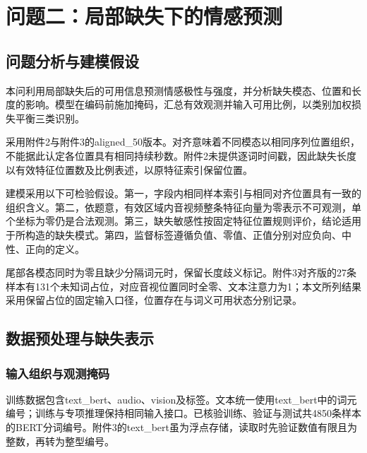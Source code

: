 \section{问题二：局部缺失下的情感预测}
\hypertarget{q2-ux95eeux9898ux5206ux6790ux4e0eux5efaux6a21ux5047ux8bbe}{%
\subsection{问题分析与建模假设}\label{q2-ux95eeux9898ux5206ux6790ux4e0eux5efaux6a21ux5047ux8bbe}}

本问利用局部缺失后的可用信息预测情感极性与强度，并分析缺失模态、位置和长度的影响。模型在编码前施加掩码，汇总有效观测并输入可用比例，以类别加权损失平衡三类识别。

采用附件2与附件3的aligned\_50版本。对齐意味着不同模态以相同序列位置组织，不能据此认定各位置具有相同持续秒数。附件2未提供逐词时间戳，因此缺失长度以有效特征位置数及比例表述，以原特征索引保留位置。

建模采用以下可检验假设。第一，字段内相同样本索引与相同对齐位置具有一致的组织含义。第二，依题意，有效区域内音视频整条特征向量为零表示不可观测，单个坐标为零仍是合法观测。第三，缺失敏感性按固定特征位置规则评价，结论适用于所构造的缺失模式。第四，监督标签遵循负值、零值、正值分别对应负向、中性、正向的定义。

尾部各模态同时为零且缺少分隔词元时，保留长度歧义标记。附件3对齐版的27条样本有131个未知词占位，对应音视位置同时全零、文本注意力为1；本文所列结果采用保留占位的固定输入口径，位置存在与词义可用状态分别记录。

\hypertarget{q2-ux6570ux636eux9884ux5904ux7406ux4e0eux7f3aux5931ux8868ux793a}{%
\subsection{数据预处理与缺失表示}\label{q2-ux6570ux636eux9884ux5904ux7406ux4e0eux7f3aux5931ux8868ux793a}}

\hypertarget{q2-ux8f93ux5165ux7ec4ux7ec7ux4e0eux89c2ux6d4bux63a9ux7801}{%
\subsubsection{输入组织与观测掩码}\label{q2-ux8f93ux5165ux7ec4ux7ec7ux4e0eux89c2ux6d4bux63a9ux7801}}

训练数据包含text\_bert、audio、vision及标签。文本统一使用text\_bert中的词元编号；训练与专项推理保持相同输入接口。已核验训练、验证与测试共4850条样本的BERT分词编号。附件3的text\_bert虽为浮点存储，读取时先验证数值有限且为整数，再转为整型编号。

